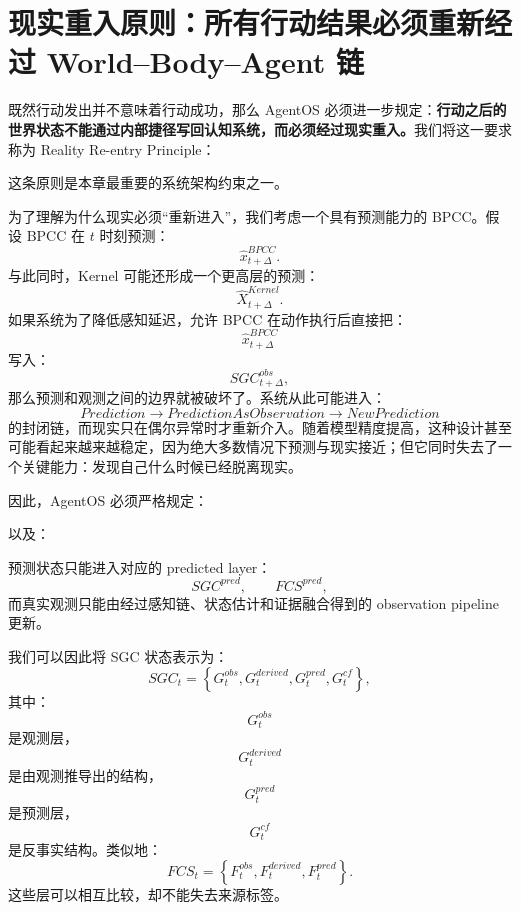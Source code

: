\section{现实重入原则：所有行动结果必须重新经过 World--Body--Agent 链}

既然行动发出并不意味着行动成功，那么 AgentOS 必须进一步规定：\textbf{行动之后的世界状态不能通过内部捷径写回认知系统，而必须经过现实重入。}我们将这一要求称为 Reality Re-entry Principle：

\begin{statementbox}
\centering
{}
\end{statementbox}

这条原则是本章最重要的系统架构约束之一。

为了理解为什么现实必须``重新进入''，我们考虑一个具有预测能力的 BPCC。假设 BPCC 在 $t$ 时刻预测：
\[
\hat{x}_{t+\Delta}^{BPCC}.
\]
与此同时，Kernel 可能还形成一个更高层的预测：
\[
\hat{X}_{t+\Delta}^{Kernel}.
\]
如果系统为了降低感知延迟，允许 BPCC 在动作执行后直接把：
\[
\hat{x}_{t+\Delta}^{BPCC}
\]
写入：
\[
SGC^{obs}_{t+\Delta},
\]
那么预测和观测之间的边界就被破坏了。系统从此可能进入：
\[
Prediction
\rightarrow
PredictionAsObservation
\rightarrow
NewPrediction
\]
的封闭链，而现实只在偶尔异常时才重新介入。随着模型精度提高，这种设计甚至可能看起来越来越稳定，因为绝大多数情况下预测与现实接近；但它同时失去了一个关键能力：发现自己什么时候已经脱离现实。

因此，AgentOS 必须严格规定：
\begin{statementbox}
\centering
{}
\end{statementbox}
以及：
\begin{statementbox}
\centering
{}
\end{statementbox}
预测状态只能进入对应的 predicted layer：
\[
SGC^{pred},\qquad FCS^{pred},
\]
而真实观测只能由经过感知链、状态估计和证据融合得到的 observation pipeline 更新。

我们可以因此将 SGC 状态表示为：
\[
SGC_t
=
\left\{
G_t^{obs},
G_t^{derived},
G_t^{pred},
G_t^{cf}
\right\},
\]
其中：
\[
G_t^{obs}
\]
是观测层，
\[
G_t^{derived}
\]
是由观测推导出的结构，
\[
G_t^{pred}
\]
是预测层，
\[
G_t^{cf}
\]
是反事实结构。类似地：
\[
FCS_t
=
\left\{
F_t^{obs},
F_t^{derived},
F_t^{pred}
\right\}.
\]
这些层可以相互比较，却不能失去来源标签。

